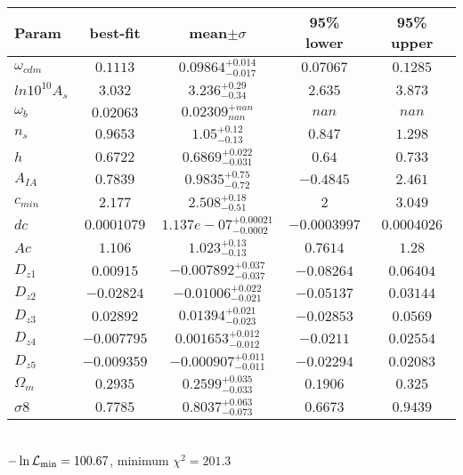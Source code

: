 \begin{tabular}{|l|c|c|c|c|} 
 \hline 
Param & best-fit & mean$\pm\sigma$ & 95\% lower & 95\% upper \\ \hline 
$\omega_{cdm }$ &$0.1113$ & $0.09864_{-0.017}^{+0.014}$ & $0.07067$ & $0.1285$ \\ 
$ln10^{10}A_{s }$ &$3.032$ & $3.236_{-0.34}^{+0.29}$ & $2.635$ & $3.873$ \\ 
$\omega_{b }$ &$0.02063$ & $0.02309_{nan}^{+nan}$ & $nan$ & $nan$ \\ 
$n_{s }$ &$0.9653$ & $1.05_{-0.13}^{+0.12}$ & $0.847$ & $1.298$ \\ 
$h$ &$0.6722$ & $0.6869_{-0.031}^{+0.022}$ & $0.64$ & $0.733$ \\ 
$A_{IA }$ &$0.7839$ & $0.9835_{-0.72}^{+0.75}$ & $-0.4845$ & $2.461$ \\ 
$c_{min }$ &$2.177$ & $2.508_{-0.51}^{+0.18}$ & $2$ & $3.049$ \\ 
$dc$ &$0.0001079$ & $1.137e-07_{-0.0002}^{+0.00021}$ & $-0.0003997$ & $0.0004026$ \\ 
$Ac$ &$1.106$ & $1.023_{-0.13}^{+0.13}$ & $0.7614$ & $1.28$ \\ 
$D_{z1 }$ &$0.00915$ & $-0.007892_{-0.037}^{+0.037}$ & $-0.08264$ & $0.06404$ \\ 
$D_{z2 }$ &$-0.02824$ & $-0.01006_{-0.021}^{+0.022}$ & $-0.05137$ & $0.03144$ \\ 
$D_{z3 }$ &$0.02892$ & $0.01394_{-0.023}^{+0.021}$ & $-0.02853$ & $0.0569$ \\ 
$D_{z4 }$ &$-0.007795$ & $0.001653_{-0.012}^{+0.012}$ & $-0.0211$ & $0.02554$ \\ 
$D_{z5 }$ &$-0.009359$ & $-0.000907_{-0.011}^{+0.011}$ & $-0.02294$ & $0.02083$ \\ 
$\Omega_{m }$ &$0.2935$ & $0.2599_{-0.033}^{+0.035}$ & $0.1906$ & $0.325$ \\ 
$\sigma8$ &$0.7785$ & $0.8037_{-0.073}^{+0.063}$ & $0.6673$ & $0.9439$ \\ 
\hline 
 \end{tabular} \\ 
$-\ln{\cal L}_\mathrm{min} =100.67$, minimum $\chi^2=201.3$ \\ 
